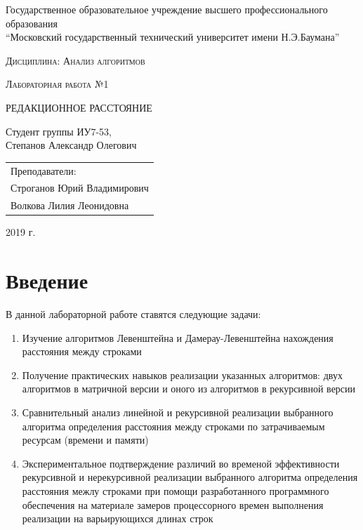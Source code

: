 \documentclass[a4paper,12pt]{article}
\newcommand{\anonsection}[1]{\section*{#1}\addcontentsline{toc}{section}{#1}}
\begin{document}
\begin{titlepage}

    \begin{center}
        \large
        Государственное образовательное учреждение высшего профессионального образования\\
        “Московский государственный технический университет имени Н.Э.Баумана”
        \vspace{3cm}

        \textsc{Дисциплина: Анализ алгоритмов}
        \vspace{0.5cm}

        \textsc{Лабораторная работа №1}
        \vspace{3cm}

        {\LARGE РЕДАКЦИОННОЕ РАССТОЯНИЕ}
        \vspace{3cm}

        Студент группы ИУ7-53,\\
        Степанов Александр Олегович
        \vfill
    \end{center}

    \begin{flushright}
        \begin{tabular}{l}
            Преподаватели:\\
            Строганов Юрий Владимирович\\
            Волкова Лилия Леонидовна
        \end{tabular}
    \end{flushright}

    \begin{center}

        2019 г.

    \end{center}

\end{titlepage}

\tableofcontents

\newpage
\anonsection{Введение}

В данной лабораторной работе ставятся следующие задачи:

\begin{enumerate}
    \item Изучение алгоритмов Левенштейна и Дамерау-Левенштейна нахождения
        расстояния между строками
    \item Получение практических навыков реализации указанных алгоритмов:
        двух алгоритмов в матричной версии и оного из алгоритмов в рекурсивной
        версии
    \item Сравнительный анализ линейной и рекурсивной реализации выбранного
        алгоритма определения расстояния между строками по затрачиваемым
        ресурсам (времени и памяти)
    \item Экспериментальное подтверждение различий во временой эффективности
        рекурсивной и нерекурсивной реализации выбранного алгоритма
        определения расстояния межлу строками при помощи разработанного
        программного обеспечения на материале замеров процессорного времен
        выполнения реализации на варьирующихся длинах строк
\end{enumerate}
\end{document}
